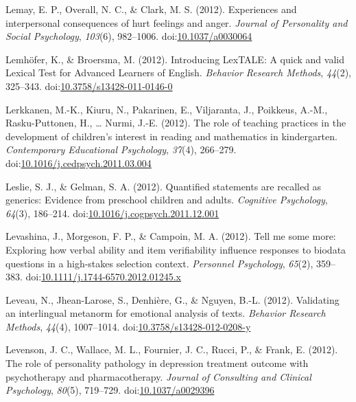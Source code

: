 \documentclass[english,man]{apa6}
\theoremstyle{definition}
\theoremstyle{definition}
\theoremstyle{definition}
\theoremstyle{remark}
\begin{document}
\hypertarget{ref-Lemay2012}{}
Lemay, E. P., Overall, N. C., \& Clark, M. S. (2012). Experiences and
interpersonal consequences of hurt feelings and anger. \emph{Journal of
Personality and Social Psychology}, \emph{103}(6), 982--1006.
doi:\href{https://doi.org/10.1037/a0030064}{10.1037/a0030064}

\hypertarget{ref-Lemhofer2012}{}
Lemhöfer, K., \& Broersma, M. (2012). Introducing LexTALE: A quick and
valid Lexical Test for Advanced Learners of English. \emph{Behavior
Research Methods}, \emph{44}(2), 325--343.
doi:\href{https://doi.org/10.3758/s13428-011-0146-0}{10.3758/s13428-011-0146-0}

\hypertarget{ref-Lerkkanen2012}{}
Lerkkanen, M.-K., Kiuru, N., Pakarinen, E., Viljaranta, J., Poikkeus,
A.-M., Rasku-Puttonen, H., \ldots{} Nurmi, J.-E. (2012). The role of
teaching practices in the development of children's interest in reading
and mathematics in kindergarten. \emph{Contemporary Educational
Psychology}, \emph{37}(4), 266--279.
doi:\href{https://doi.org/10.1016/j.cedpsych.2011.03.004}{10.1016/j.cedpsych.2011.03.004}

\hypertarget{ref-Leslie2012}{}
Leslie, S. J., \& Gelman, S. A. (2012). Quantified statements are
recalled as generics: Evidence from preschool children and adults.
\emph{Cognitive Psychology}, \emph{64}(3), 186--214.
doi:\href{https://doi.org/10.1016/j.cogpsych.2011.12.001}{10.1016/j.cogpsych.2011.12.001}

\hypertarget{ref-Levashina2012}{}
Levashina, J., Morgeson, F. P., \& Campoin, M. A. (2012). Tell me some
more: Exploring how verbal ability and item verifiability influence
responses to biodata questions in a high-stakes selection context.
\emph{Personnel Psychology}, \emph{65}(2), 359--383.
doi:\href{https://doi.org/10.1111/j.1744-6570.2012.01245.x}{10.1111/j.1744-6570.2012.01245.x}

\hypertarget{ref-Leveau2012}{}
Leveau, N., Jhean-Larose, S., Denhière, G., \& Nguyen, B.-L. (2012).
Validating an interlingual metanorm for emotional analysis of texts.
\emph{Behavior Research Methods}, \emph{44}(4), 1007--1014.
doi:\href{https://doi.org/10.3758/s13428-012-0208-y}{10.3758/s13428-012-0208-y}

\hypertarget{ref-Levenson2012}{}
Levenson, J. C., Wallace, M. L., Fournier, J. C., Rucci, P., \& Frank,
E. (2012). The role of personality pathology in depression treatment
outcome with psychotherapy and pharmacotherapy. \emph{Journal of
Consulting and Clinical Psychology}, \emph{80}(5), 719--729.
doi:\href{https://doi.org/10.1037/a0029396}{10.1037/a0029396}
\end{document}
